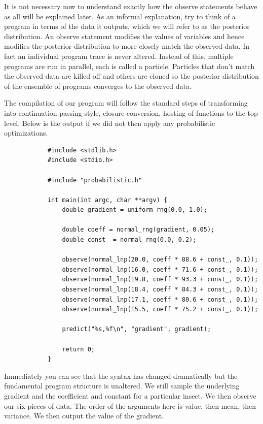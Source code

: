 \documentclass[a4paper]{article}
\begin{document}
It is not necessary now to understand exactly how the observe statements behave as all will be explained later. As an informal explanation, try to think of a program in terms of the data it outputs, which we will refer to as the posterior distribution. An observe statement modifies the values of variables and hence modifies the posterior distribution to more closely match the observed data. In fact an individual program trace is never altered. Instead of this, multiple programs are run in parallel, each is called a particle. Particles that don't match the observed data are killed off and others are cloned so the posterior distribution of the ensemble of programs converges to the observed data.

The compilation of our program will follow the standard steps of transforming into continuation passing style, closure conversion, hosting of functions to the top level. Below is the output if we did not then apply any probabilistic optimizations.

\begin{center}
	\begin{varwidth}{\linewidth}
		\small
		\begin{verbatim}
			#include <stdlib.h>
			#include <stdio.h>

			#include "probabilistic.h"

			int main(int argc, char **argv) {
			    double gradient = uniform_rng(0.0, 1.0);

			    double coeff = normal_rng(gradient, 0.05);
			    double const_ = normal_rng(0.0, 0.2);

			    observe(normal_lnp(20.0, coeff * 88.6 + const_, 0.1));
			    observe(normal_lnp(16.0, coeff * 71.6 + const_, 0.1));
			    observe(normal_lnp(19.8, coeff * 93.3 + const_, 0.1));
			    observe(normal_lnp(18.4, coeff * 84.3 + const_, 0.1));
			    observe(normal_lnp(17.1, coeff * 80.6 + const_, 0.1));
			    observe(normal_lnp(15.5, coeff * 75.2 + const_, 0.1));

			    predict("%s,%f\n", "gradient", gradient);

			    return 0;
			}
		\end{verbatim}
	\end{varwidth}
\end{center}
Immediately you can see that the syntax has changed dramatically but the fundamental program structure is unaltered. We still sample the underlying gradient and the coefficient and constant for a particular insect. We then observe our six pieces of data. The order of the arguments here is value, then mean, then variance. We then output the value of the gradient.
\end{document}
